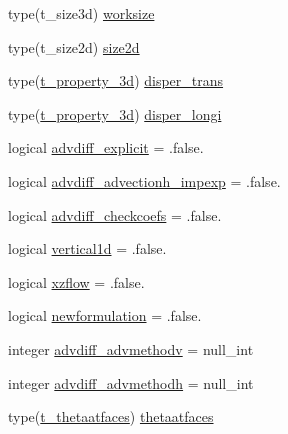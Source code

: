 \begin{DoxyCompactItemize}
type(t\+\_\+size3d) \mbox{\hyperlink{structmoduleporousmediaproperties_1_1t__porousmediaproperties_a41c7437caeb2dbce57b03e17c8f04db3}{worksize}}
\item 
type(t\+\_\+size2d) \mbox{\hyperlink{structmoduleporousmediaproperties_1_1t__porousmediaproperties_ab9afed7957a395ad546e2a7cb8f424f5}{size2d}}
\item 
type(\mbox{\hyperlink{structmoduleporousmediaproperties_1_1t__property__3d}{t\+\_\+property\+\_\+3d}}) \mbox{\hyperlink{structmoduleporousmediaproperties_1_1t__porousmediaproperties_ae581b05d78b0d948eac5fcc878409629}{disper\+\_\+trans}}
\item 
type(\mbox{\hyperlink{structmoduleporousmediaproperties_1_1t__property__3d}{t\+\_\+property\+\_\+3d}}) \mbox{\hyperlink{structmoduleporousmediaproperties_1_1t__porousmediaproperties_a791333fea37fb7e83cad16ddb8e470fb}{disper\+\_\+longi}}
\item 
logical \mbox{\hyperlink{structmoduleporousmediaproperties_1_1t__porousmediaproperties_aaf53cdd30866e039fc35628be37635f7}{advdiff\+\_\+explicit}} = .false.
\item 
logical \mbox{\hyperlink{structmoduleporousmediaproperties_1_1t__porousmediaproperties_aa3acd2da5acfe90339fc661959e14822}{advdiff\+\_\+advectionh\+\_\+impexp}} = .false.
\item 
logical \mbox{\hyperlink{structmoduleporousmediaproperties_1_1t__porousmediaproperties_a4ed239614fa2b3186c468cc21f25679c}{advdiff\+\_\+checkcoefs}} = .false.
\item 
logical \mbox{\hyperlink{structmoduleporousmediaproperties_1_1t__porousmediaproperties_aefe8c83d71663008cb7a1a6173489b76}{vertical1d}} = .false.
\item 
logical \mbox{\hyperlink{structmoduleporousmediaproperties_1_1t__porousmediaproperties_abcc9d401ee0d681c80d705dbfaf9d8a3}{xzflow}} = .false.
\item 
logical \mbox{\hyperlink{structmoduleporousmediaproperties_1_1t__porousmediaproperties_a8ed4f6bec100144734b4b3556e8a0518}{newformulation}} = .false.
\item 
integer \mbox{\hyperlink{structmoduleporousmediaproperties_1_1t__porousmediaproperties_abc602061b7be2b21f486889db345d06b}{advdiff\+\_\+advmethodv}} = null\+\_\+int
\item 
integer \mbox{\hyperlink{structmoduleporousmediaproperties_1_1t__porousmediaproperties_a439f875cc5d19dcbafeaa5c01e61439d}{advdiff\+\_\+advmethodh}} = null\+\_\+int
\item 
type(\mbox{\hyperlink{structmoduleporousmediaproperties_1_1t__thetaatfaces}{t\+\_\+thetaatfaces}}) \mbox{\hyperlink{structmoduleporousmediaproperties_1_1t__porousmediaproperties_a4aec74be6c68ba8b12e10387abad17fa}{thetaatfaces}}

\end{DoxyCompactItemize}

